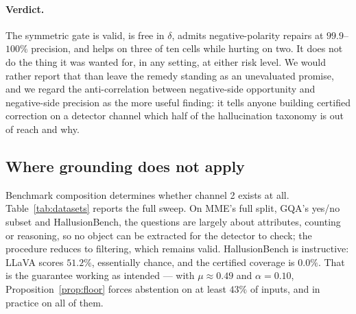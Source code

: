 \documentclass{article}
\theoremstyle{plain}
\theoremstyle{definition}
\theoremstyle{remark}
\begin{document}
\paragraph{Verdict.}
The symmetric gate is valid, is free in $\delta$, admits negative-polarity repairs at
$99.9$--$100\%$ precision, and helps on three of ten cells while hurting on two. It does not do
the thing it was wanted for, in any setting, at either risk level. We would rather report that
than leave the remedy standing as an unevaluated promise, and we regard the anti-correlation
between negative-side opportunity and negative-side precision as the more useful finding: it
tells anyone building certified correction on a detector channel which half of the hallucination
taxonomy is out of reach and why.

\subsection{Where grounding does not apply}
\label{sec:exp:noapply}

Benchmark composition determines whether channel 2 exists at all.
Table~\ref{tab:datasets} reports the full sweep. On MME's full split, GQA's yes/no subset
and HallusionBench, the questions are largely about attributes, counting or reasoning, so no
object can be extracted for the detector to check; the procedure reduces to filtering, which
remains valid. HallusionBench is instructive: LLaVA scores $51.2\%$, essentially chance, and
the certified coverage is $0.0\%$. That is the guarantee working as intended --- with
$\mu\approx0.49$ and $\alpha=0.10$, Proposition~\ref{prop:floor} forces abstention on at
least $43\%$ of inputs, and in practice on all of them.
\end{document}
